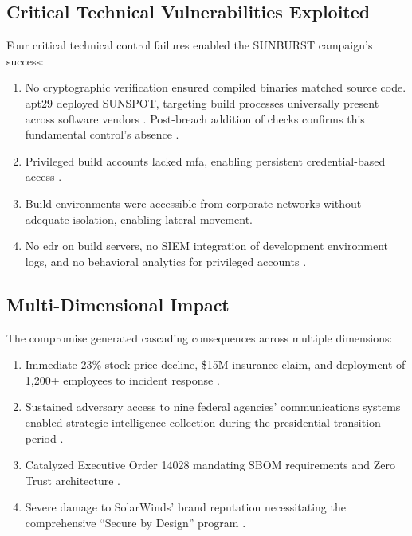 \subsection{Critical Technical Vulnerabilities Exploited}
Four critical technical control failures enabled the SUNBURST campaign's success:

\begin{enumerate}
    \item {} No cryptographic verification ensured compiled binaries matched source code. \gls{apt}29 deployed SUNSPOT, targeting build processes universally present across software vendors \cite{us_open_2021}. Post-breach addition of checks confirms this fundamental control's absence \cite{nagle_solarwinds_2023}.
    \item {} Privileged build accounts lacked \gls{mfa}, enabling persistent credential-based access \cite{nagle_solarwinds_2023}.
    \item {} Build environments were accessible from corporate networks without adequate isolation, enabling lateral movement.
    \item {} No \gls{edr} on build servers, no SIEM integration of development environment logs, and no behavioral analytics for privileged accounts \cite{nagle_solarwinds_2023}.
\end{enumerate}

\subsection{Multi-Dimensional Impact}
The compromise generated cascading consequences across multiple dimensions:

\begin{enumerate}
    \item {} Immediate 23\% stock price decline, \$15M insurance claim, and deployment of 1,200+ employees to incident response \cite{nagle_solarwinds_2023}.
    \item {} Sustained adversary access to nine federal agencies' communications systems enabled strategic intelligence collection during the presidential transition period \cite{nagle_solarwinds_2023, us_open_2021}.
    \item {} Catalyzed Executive Order 14028 mandating SBOM requirements and Zero Trust architecture \cite{us_eo_2021}.
    \item {} Severe damage to SolarWinds' brand reputation necessitating the comprehensive ``Secure by Design'' program \cite{nagle_solarwinds_2023, ramakrishna_our_2021}.
\end{enumerate}

